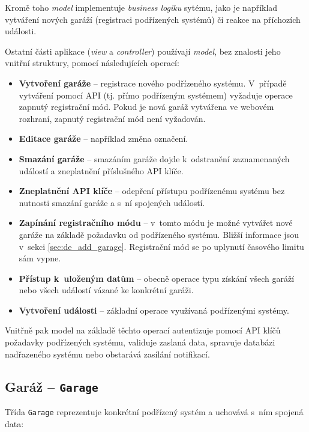 Kromě toho \textit{model} implementuje \textit{business logiku} sytému, jako je například vytváření nových garáží (registraci podřízených systémů) či reakce na příchozích události.

Ostatní části aplikace (\textit{view} a \textit{controller}) používají \textit{model}, bez znalosti jeho vnitřní struktury, pomocí následujících operací:

\begin{itemize}
    \item \textbf{Vytvoření garáže} -- registrace nového podřízeného systému. V~případě vytváření pomocí API (tj. přímo podřízeným systémem) vyžaduje operace zapnutý registrační mód. Pokud je nová garáž vytvářena ve webovém rozhraní, zapnutý registrační mód není vyžadován.
    \item \textbf{Editace garáže} -- například změna označení.
    \item \textbf{Smazání garáže} -- smazáním garáže dojde k~odstranění zaznamenaných událostí a zneplatnění příslušného API klíče.
    \item \textbf{Zneplatnění API klíče} -- odepření přístupu podřízenému systému bez nutnosti smazání garáže a s~ní spojených událostí.
    \item \textbf{Zapínání registračního módu} -- v~tomto módu je možné vytvářet nové garáže na základě požadavku od podřízeného systému. Bližší informace jsou v~sekci \ref{sec:de_add_garage}. Registrační mód se po uplynutí časového limitu sám vypne.
    \item \textbf{Přístup k~uloženým datům} -- obecně operace typu získání všech garáží nebo všech událostí vázané ke konkrétní garáži.
    \item \textbf{Vytvoření události} -- základní operace využívaná podřízenými systémy.
\end{itemize}

Vnitřně pak model na základě těchto operací autentizuje pomocí API klíčů požadavky podřízených systému, validuje zaslaná data, spravuje databázi nadřazeného systému nebo obstarává zasílání notifikací.

\subsection{Garáž -- \texttt{Garage}}

Třída \texttt{Garage} reprezentuje konkrétní podřízený systém a uchovává s~ním spojená data:

